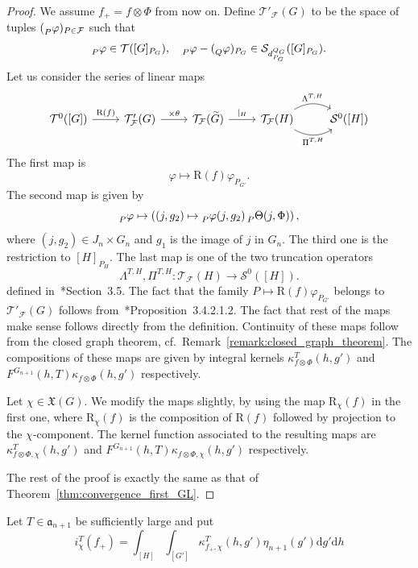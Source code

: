 \documentclass[letterpaper,11pt]{amsart}
\newcommand{\fa}{\mathfrak{a}}
\newcommand{\fX}{\mathfrak{X}}
\newcommand{\cF}{\mathcal{F}}
\newcommand{\cS}{\mathcal{S}}
\newcommand{\cT}{\mathcal{T}}
\newcommand{\rd}{\mathrm{d}}
\newcommand{\<}{\negthickspace}
\theoremstyle{definition}
\theoremstyle{plain}
\theoremstyle{remark}
\numberwithin{equation}{section}
\begin{document}
\begin{proof}
We assume $f_+ = f \otimes \Phi$ from now on. Define
$\cT'_{\cF}(G)$ to be the space of tuples
$(\prescript{}{P}{\varphi})_{P \in \cF}$ such that
    \[
    \prescript{}{P}{\varphi} \in \cT([G]_{P_G}), \quad
    \prescript{}{P}{\varphi} - (\prescript{}{Q}{\varphi})_{P_G} \in
    \cS_{d_{P_G}^{Q_G}}([G]_{P_G}).
    \]
Let us consider the series of linear maps
\[
 \begin{tikzcd}
{\cT^0([G])} \arrow[r, "\mathrm{R}(f)"] & \cT'_{\cF}(G) \arrow[r, "\times \theta"] & \cT_\cF(\widetilde{G}) \arrow[r, "|_H"] & \cT_\cF(H) \arrow[r, "\Lambda^{T,H}", bend left] \arrow[r, "\Pi^{T,H}"', bend right] & {\cS^0([H])}
\end{tikzcd}
\]
The first map is
    \[
    \varphi \mapsto \mathrm{R}(f)\varphi_{P_{G'}}.
    \]
The second map is given by
    \[
    \prescript{}{P}{\varphi} \mapsto
    \left( (j, g_2) \mapsto \prescript{}{P}{\varphi}(j, g_2)
    \prescript{}{P}{\Theta}(j,\Phi) \right),
    \]
where $(j, g_2) \in J_n \times G_n$ and $g_1$ is the image of
$j$ in $G_n$. The third one is the restriction to $[H]_{P_H}$.
The last map is one of the two truncation operators
    \[
    \Lambda^{T, H}, \Pi^{T, H}:
    \cT_{\cF} (H) \to \cS^0([H]).
    \]
defined in~\cite{BPCZ}*{Section~3.5}. The fact that the family $P \mapsto
\mathrm{R}(f)\varphi_{P_{G'}}$ belongs to $\cT'_{\cF}(G)$
follows from~\cite{BPCZ}*{Proposition~3.4.2.1.2}. The fact that rest of the
maps make sense follows directly from the definition. Continuity of these maps
follow from the closed graph theorem,
cf.~Remark~\ref{remark:closed_graph_theorem}. The compositions of
these maps are given by integral kernels $\kappa_{f \otimes \Phi}^T(h, g')$
and $F^{G_{n+1}}(h, T) \kappa_{f \otimes \Phi}(h, g')$ respectively.

Let $\chi \in \fX(G)$. We modify the maps slightly, by using the map
$\mathrm{R}_{\chi}(f)$ in the first one, where $\mathrm{R}_{\chi}(f)$ is the
composition of $\mathrm{R}(f)$ followed by projection to the
$\chi$-component. The kernel function associated to the resulting maps are
$\kappa_{f \otimes \Phi, \chi}^T(h, g')$ and $F^{G_{n+1}}(h, T) \kappa_{f
\otimes \Phi, \chi}(h, g')$ respectively.

The rest of the proof is exactly the same as that of
Theorem~\ref{thm:convergence_first_GL}.
\end{proof}




Let $T \in \fa_{n+1}$ be sufficiently large and put
    \[
    i_{\chi}^T( f_+) = \int_{[H]} \int_{[G']}
    \kappa_{f_+, \chi}^T(h, g')
    \eta_{n+1}(g') \rd g' \rd h
    \]
\end{document}
